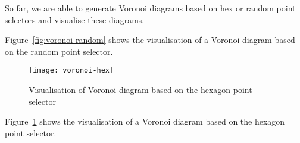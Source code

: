 
So far, we are able to generate Voronoi diagrams based on hex or random point selectors and visualise these diagrams.

Figure~\ref{fig:voronoi-random} shows the visualisation of a Voronoi diagram based on the random point selector.

\begin{figure}[H]
	\centering
	\texttt{[image: voronoi-hex]}
	\caption{Visualisation of Voronoi diagram based on the hexagon point selector}
	\label{fig:voronoi-hex}
\end{figure}

Figure~\ref{fig:voronoi-hex} shows the visualisation of a Voronoi diagram based on the hexagon point selector.

